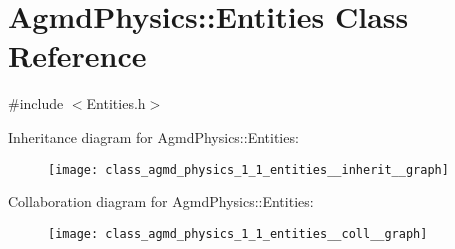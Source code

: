 \hypertarget{class_agmd_physics_1_1_entities}{\section{Agmd\+Physics\+:\+:Entities Class Reference}
\label{class_agmd_physics_1_1_entities}
}


{\ttfamily \#include $<$Entities.\+h$>$}



Inheritance diagram for Agmd\+Physics\+:\+:Entities\+:\nopagebreak
\begin{figure}[H]
\begin{center}
\leavevmode
\texttt{[image: class\_agmd\_physics\_1\_1\_entities\_\_inherit\_\_graph]}
\end{center}
\end{figure}


Collaboration diagram for Agmd\+Physics\+:\+:Entities\+:\nopagebreak
\begin{figure}[H]
\begin{center}
\leavevmode
\texttt{[image: class\_agmd\_physics\_1\_1\_entities\_\_coll\_\_graph]}
\end{center}
\end{figure}
